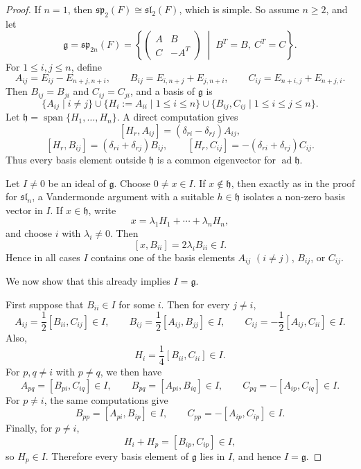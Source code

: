 \begin{proof}
    If $n=1$, then $\mathfrak{sp}_2(F)\cong \mathfrak{sl}_2(F)$, which is simple. So assume $n\ge2$, and let
    \[
        \mathfrak{g}=\mathfrak{sp}_{2n}(F)=\left\{\begin{pmatrix} A & B \\ C & -A^T \end{pmatrix} \;\middle|\; B^T=B,\ C^T=C \right\}.
    \]
    For $1\le i,j\le n$, define
    \[
        A_{ij}=E_{ij}-E_{n+j,n+i},\qquad
        B_{ij}=E_{i,n+j}+E_{j,n+i},\qquad
        C_{ij}=E_{n+i,j}+E_{n+j,i}.
    \]
    Then $B_{ij}=B_{ji}$ and $C_{ij}=C_{ji}$, and a basis of $\mathfrak{g}$ is
    \[
        \{A_{ij}\mid i\neq j\}\cup \{H_i:=A_{ii}\mid 1\le i\le n\}\cup \{B_{ij},C_{ij}\mid 1\le i\le j\le n\}.
    \]
    Let $\mathfrak{h}=\operatorname{span}\{H_1,\dots,H_n\}$. A direct computation gives
    \[
        [H_r,A_{ij}]=(\delta_{ri}-\delta_{rj})A_{ij},
    \]
    \[
        [H_r,B_{ij}]=(\delta_{ri}+\delta_{rj})B_{ij},
        \qquad
        [H_r,C_{ij}]=-(\delta_{ri}+\delta_{rj})C_{ij}.
    \]
    Thus every basis element outside $\mathfrak{h}$ is a common eigenvector for $\operatorname{ad}\mathfrak{h}$.

    Let $I\neq0$ be an ideal of $\mathfrak{g}$. Choose $0\neq x\in I$. If $x\notin \mathfrak{h}$, then exactly as in the proof for $\mathfrak{sl}_n$, a Vandermonde argument with a suitable $h\in\mathfrak{h}$ isolates a non-zero basis vector in $I$. If $x\in \mathfrak{h}$, write
    \[
        x=\lambda_1H_1+\cdots+\lambda_nH_n,
    \]
    and choose $i$ with $\lambda_i\neq0$. Then
    \[
        [x,B_{ii}]=2\lambda_i B_{ii}\in I.
    \]
    Hence in all cases $I$ contains one of the basis elements $A_{ij}$ $(i\neq j)$, $B_{ij}$, or $C_{ij}$.

    We now show that this already implies $I=\mathfrak{g}$.

    First suppose that $B_{ii}\in I$ for some $i$. Then for every $j\neq i$,
    \[
        A_{ij}=\frac{1}{2}[B_{ii},C_{ij}]\in I,\qquad
        B_{ij}=\frac{1}{2}[A_{ij},B_{jj}]\in I,\qquad
        C_{ij}=-\frac{1}{2}[A_{ij},C_{ii}]\in I.
    \]
    Also,
    \[
        H_i=\frac{1}{4}[B_{ii},C_{ii}]\in I.
    \]
    For $p,q\neq i$ with $p\neq q$, we then have
    \[
        A_{pq}=[B_{pi},C_{iq}]\in I,\qquad
        B_{pq}=[A_{pi},B_{iq}]\in I,\qquad
        C_{pq}=-[A_{ip},C_{iq}]\in I.
    \]
    For $p\neq i$, the same computations give
    \[
        B_{pp}=[A_{pi},B_{ip}]\in I,\qquad C_{pp}=-[A_{ip},C_{ip}]\in I.
    \]
    Finally, for $p\neq i$,
    \[
        H_i+H_p=[B_{ip},C_{ip}]\in I,
    \]
    so $H_p\in I$. Therefore every basis element of $\mathfrak{g}$ lies in $I$, and hence $I=\mathfrak{g}$.


\end{proof}
